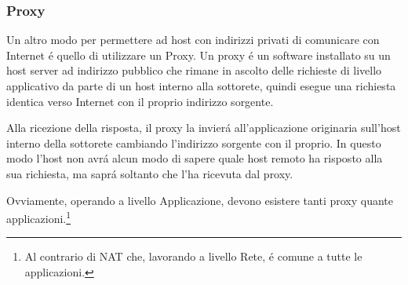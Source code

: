 \documentclass[12pt]{article}
\begin{document}
\subsubsection{Proxy}\label{pazio-indirizzamento-in-ip-indirizzi-pubblici-privati-proxy}
Un altro modo per permettere ad host con indirizzi privati di comunicare con Internet \'e quello di utilizzare un Proxy.
Un proxy \'e un software installato su un host server ad indirizzo pubblico che rimane in ascolto delle richieste di 
livello applicativo da parte di un host interno alla sottorete, quindi esegue una richiesta identica verso Internet con 
il proprio indirizzo sorgente.

Alla ricezione della risposta, il proxy la invier\'a all'applicazione originaria sull'host interno della sottorete 
cambiando l'indirizzo sorgente con il proprio. In questo modo l'host non avr\'a alcun modo di sapere quale host remoto 
ha risposto alla sua richiesta, ma sapr\'a soltanto che l'ha ricevuta dal proxy.

Ovviamente, operando a livello Applicazione, devono esistere tanti proxy quante applicazioni.\footnote{Al contrario di 
NAT che, lavorando a livello Rete, \'e comune a tutte le applicazioni.} 

\clearpage
\end{document}
